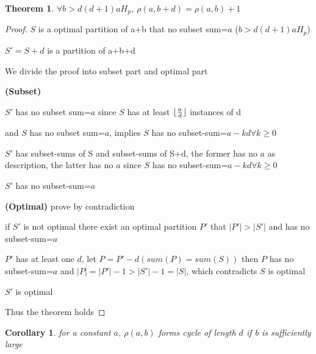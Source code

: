 \documentclass[12pt,a4paper]{article}
\DeclarePairedDelimiter\floor{\lfloor}{\rfloor}
\newtheorem{theorem}{Theorem}[section]
\newtheorem{corollary}{Corollary}[theorem]
\begin{document}
\begin{theorem}
	$\forall b>d(d+1)aH_p$, $\rho(a,b+d)=\rho(a,b)+1$
\end{theorem}

\begin{proof}

    $S$ is a optimal partition of a+b that no subset sum=$a$ ($b>d(d+1)aH_p$)
    
    $S'=S+d$ is a partition of a+b+d 

    We divide the proof into subset part and optimal part

    {\bf(Subset)}

    $S'$ has no subset sum=$a$ since $S$ has at least $\floor{\frac{a}{d}}$ instances of d

    and $S$ has no subset sum=$a$, implies $S$ has no subset-sum=$a-kd \forall k\geq0$

    $S'$ has subset-sums of S and subset-sums of S+d, the former has no $a$ as description, the latter has no $a$ since $S$ has no subset-sum=$a-kd\forall k\geq0$

    $S'$ has no subset-sum=$a$

    {\bf(Optimal)}
        prove by contradiction

        if $S'$ is not optimal there exist an optimal partition $P'$ that $|P'|>|S'|$ and has no subset-sum=$a$

        $P'$ has at least one $d$, let $P=P'-d(sum(P)=sum(S))$ then $P$ has no subset-sum=$a$ and $|P|=|P'|-1>|S'|-1=|S|$, which contradicts $S$ is optimal

        $S'$ is optimal

    Thus the theorem holds
\end{proof}

\begin{corollary}
for a constant $a$, $\rho(a,b)$ forms cycle of length $d$ if b is sufficiently large
\end{corollary}
\end{document}
